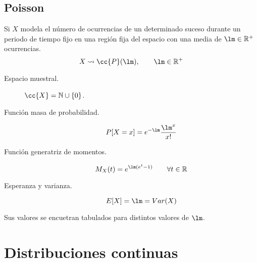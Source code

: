 \subsection{Poisson}
\noindent
Si $X$ modela el número de ocurrencias de un determinado suceso durante un periodo de tiempo fijo en una región fija del espacio con una media de $\lm \in \mathbb{R}^+$ ocurrencias.
\begin{equation*}
    X\rightsquigarrow\cc{P}(\lm), \qquad \lm \in \mathbb{R}^+
\end{equation*}
\begin{description}
    \item [Espacio muestral.] $\cc{X} = \mathbb{N}\cup \{0\}$.
    \item [Función masa de probabilidad.] 
        \begin{equation*}
            P[X=x] = e^{-\lm} \dfrac{\lm^x}{x!}
        \end{equation*}
    \item [Función generatriz de momentos.] 
        \begin{equation*}
            M_X(t) = e^{\lm(e^t-1)} \qquad \forall t\in \mathbb{R}
        \end{equation*}
    \item [Esperanza y varianza.] 
        \begin{equation*}
            E[X] = \lm = Var(X)
        \end{equation*}
\end{description}
Sus valores se encuetran tabulados para distintos valores de $\lm$.

\section{Distribuciones continuas}
